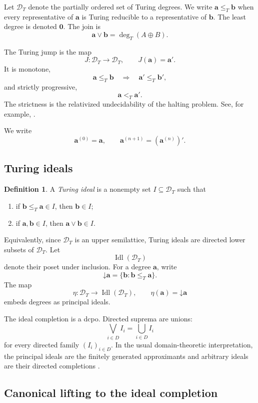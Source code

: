 \documentclass[11pt]{article}
\theoremstyle{definition}
\newtheorem{definition}[theorem]{Definition}
\theoremstyle{remark}
\newcommand{\DT}{\mathcal D_T}
\newcommand{\Idl}{\operatorname{Idl}}
\newcommand{\down}{\mathord{\downarrow}}
\newcommand{\join}{\mathbin{\oplus}}
\newcommand{\leT}{\leq_T}
\newcommand{\ltT}{<_T}
\begin{document}
Let $\DT$ denote the partially ordered set of Turing degrees. We write
$\mathbf a\leT\mathbf b$ when every representative of $\mathbf a$ is Turing reducible to a representative of $\mathbf b$. The least degree is denoted $\mathbf0$. The join is
\[
\mathbf a\vee\mathbf b=\deg_T(A\join B).
\]

The Turing jump is the map
\[
J:\DT\to\DT,
\qquad
J(\mathbf a)=\mathbf a'.
\]
It is monotone,
\[
\mathbf a\leT\mathbf b
\quad\Longrightarrow\quad
\mathbf a'\leT\mathbf b',
\]
and strictly progressive,
\begin{equation}
\mathbf a\ltT\mathbf a'.
\label{eq:jump-strict}
\end{equation}
The strictness is the relativized undecidability of the halting problem. See, for example, \cite{KleenePost1954,ShoreSlaman1999}.

We write
\[
\mathbf a^{(0)}=\mathbf a,
\qquad
\mathbf a^{(n+1)}=(\mathbf a^{(n)})'.
\]

\subsection{Turing ideals}

\begin{definition}
A \emph{Turing ideal} is a nonempty set $I\subseteq\DT$ such that
\begin{enumerate}
\item if $\mathbf b\leT\mathbf a\in I$, then $\mathbf b\in I$;
\item if $\mathbf a,\mathbf b\in I$, then $\mathbf a\vee\mathbf b\in I$.
\end{enumerate}
\end{definition}

Equivalently, since $\DT$ is an upper semilattice, Turing ideals are directed lower subsets of $\DT$. Let
\[
\Idl(\DT)
\]
denote their poset under inclusion. For a degree $\mathbf a$, write
\[
\down\mathbf a=\{\mathbf b:\mathbf b\leT\mathbf a\}.
\]
The map
\[
\eta:\DT\to\Idl(\DT),
\qquad
\eta(\mathbf a)=\down\mathbf a
\]
embeds degrees as principal ideals.

The ideal completion is a dcpo. Directed suprema are unions:
\[
\bigvee_{i\in D}I_i=\bigcup_{i\in D}I_i
\]
for every directed family $(I_i)_{i\in D}$. In the usual domain-theoretic interpretation, the principal ideals are the finitely generated approximants and arbitrary ideals are their directed completions \cite{AbramskyJung1994}.

\subsection{Canonical lifting to the ideal completion}
\end{document}
